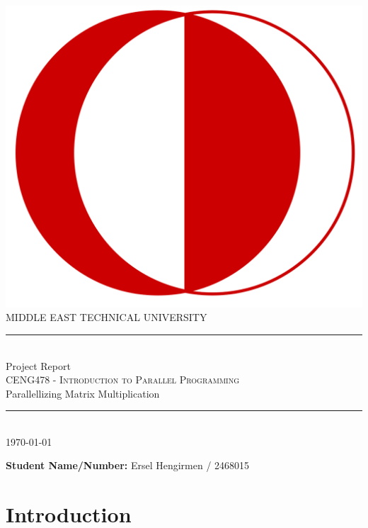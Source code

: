 \documentclass[12pt]{article}
\begin{document}
	\begin{titlepage}
		\newcommand{\HRule}{\rule{\linewidth}{0.1mm}} 
		\center 
		\includegraphics[scale=0.05]{metu} \\
		\vspace{1cm}
		\textsc{\Large MIDDLE EAST TECHNICAL UNIVERSITY}\\[0.5cm]
		\HRule \\[0.4cm]
		{ \huge \Large Project Report}\\[0.4cm]
		\textsc{\large CENG478 - Introduction to Parallel Programming}\\
		\large Parallellizing Matrix Multiplication\\
		\HRule \\[0.3cm]
		{\today}\\[1.2cm]
		
		

			\begin{flushleft} \large
				\textbf{Student Name/Number:} Ersel Hengirmen / 2468015\\
			\end{flushleft}


	\end{titlepage}
	
	\begingroup
	\hypersetup{hidelinks}
	\tableofcontents
	\endgroup
          
	\newpage
	
	\section{Introduction}
	
\end{document}
